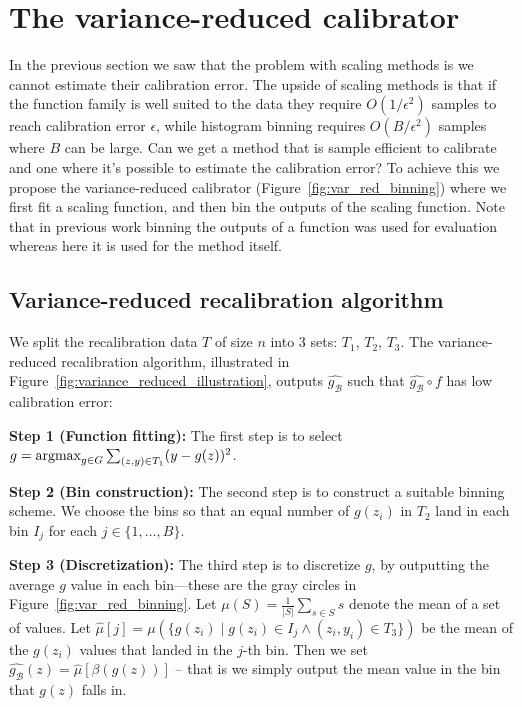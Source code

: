 \section{The variance-reduced calibrator}
\label{sec:calibrating_models}

In the previous section we saw that the problem with scaling methods is we cannot estimate their calibration error. The upside of scaling methods is that if the function family is well suited to the data they require $O(1/\epsilon^2)$ samples to reach calibration error $\epsilon$, while histogram binning requires $O(B/\epsilon^2)$ samples where $B$ can be large. Can we get a method that is sample efficient to calibrate and one where it's possible to estimate the calibration error? To achieve this we propose the variance-reduced calibrator (Figure~\ref{fig:var_red_binning}) where we first fit a scaling function, and then bin the outputs of the scaling function. Note that in previous work binning the outputs of a function was used for evaluation whereas here it is used for the method itself.

\subsection{Variance-reduced recalibration algorithm}

We split the recalibration data $T$ of size $n$ into 3 sets: $T_1$, $T_2$, $T_3$. The variance-reduced recalibration algorithm, illustrated in Figure~\ref{fig:variance_reduced_illustration}, outputs $\hat{g_{\mathcal{B}}}$ such that $\hat{g_{\mathcal{B}}} \circ f$ has low calibration error:

\textbf{Step 1 (Function fitting):} The first step is to select $g = \mathop{\mbox{argmax}}_{g \in G} \sum_{(z, y) \in T_1} (y - g(z))^2$.

\textbf{Step 2 (Bin construction):} The second step is to construct a suitable binning scheme. We choose the bins so that an equal number of $g(z_i)$ in $T_2$ land in each bin $I_j$ for each $j \in \{1, \dots, B\}$.

\textbf{Step 3 (Discretization):} The third step is to discretize $g$, by outputting the average $g$ value in each bin---these are the gray circles in Figure~\ref{fig:var_red_binning}. Let $\mu(S) = \frac{1}{|S|} \sum_{s \in S} s$ denote the mean of a set of values.
Let $\hat{\mu}[j] = \mu(\{ g(z_i) \; | \; g(z_i) \in I_j \wedge (z_i, y_i) \in T_3 \})$ be the mean of the $g(z_i)$ values that landed in the $j$-th bin.
Then we set $\hat{g_{\mathcal{B}}}(z) = \hat{\mu}[\beta(g(z))]$ -- that is we simply output the mean value in the bin that $g(z)$ falls in.

